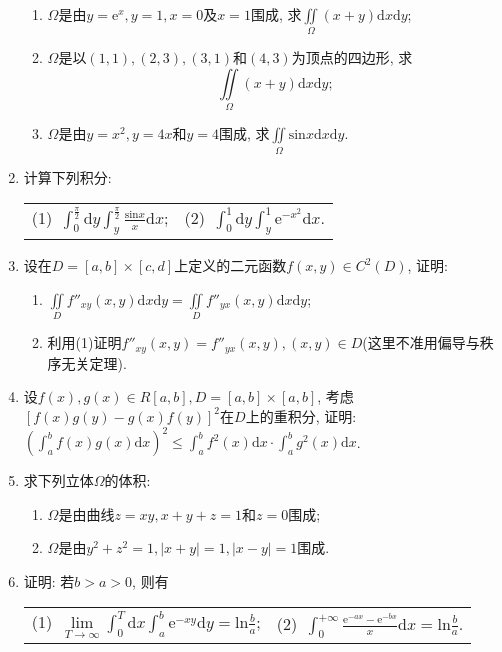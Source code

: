 \begin{enumerate}
\begin{enumerate}
	\item $\Omega$是由$y=\mathrm{e}^x, y=1,x=0$及$x=1$围成, 求$\displaystyle{\underset{\Omega}{\iint}(x+y)\mathrm{d}x\mathrm{d}y}$;
	\item $\Omega$是以$(1,1),(2,3),(3,1)$和$(4,3)$为顶点的四边形, 求$$
	\displaystyle{\underset{\Omega}{\iint}(x+y)\mathrm{d}x\mathrm{d}y};$$
	\item $\Omega$是由$y=x^2,y=4x$和$y=4$围成, 求$\displaystyle{\underset{\Omega}{\iint}\mathrm{sin}x\mathrm{d}x\mathrm{d}y}$.
\end{enumerate}
\item 计算下列积分:
\begin{table}[H]
	\begin{tabular}{ll}
		\qquad	(1)\ $\displaystyle{\int_{0}^{\frac{\pi}{2}}\mathrm{d}y\int_{y}^{\frac{\pi}{2}}\frac{\mathrm{sin}x}{x}\mathrm{d}x}$;\qquad \qquad \qquad \qquad &(2)\ $\displaystyle{\int_{0}^{1}\mathrm{d}y\int_{y}^{1}\mathrm{e}^{-x^2}\mathrm{d}x}$.
	\end{tabular}
\end{table}
\item 设在$D=[a,b]\times[c,d]$上定义的二元函数$f(x,y)\in C^2(D)$, 证明:
\begin{enumerate}
		\item $\displaystyle{\underset{D}{\iint}f''_{xy}(x,y)\mathrm{d}x\mathrm{d}y}=\displaystyle{\underset{D}{\iint}f''_{yx}(x,y)\mathrm{d}x\mathrm{d}y}$;
		\item 利用(1)证明$f''_{xy}(x,y)=f''_{yx}(x,y),(x,y)\in D$(这里不准用偏导与秩序无关定理).
\end{enumerate}
\item 设$f(x),g(x)\in R[a,b], D=[a,b]\times[a,b]$, 考虑$[f(x)g(y)-g(x)f(y)]^2$在$D$上的重积分, 证明:
$\left(\displaystyle{\int_{a}^{b}f(x)g(x)\mathrm{d}x} \right)^2\le \displaystyle{\int_{a}^{b}f^2(x)\mathrm{d}x\cdot \int_{a}^{b}g^2(x)\mathrm{d}x}$.
\item 求下列立体$\Omega$的体积:
\begin{enumerate}
	\item $\Omega$是由曲线$z=xy,x+y+z=1$和$z=0$围成;
	\item $\Omega$是由$y^2+z^2=1,|x+y|=1,|x-y|=1$围成.
\end{enumerate}
\item 证明: 若$b>a>0$, 则有
\begin{table}[H]
	\begin{tabular}{ll}
	\qquad	(1)\ $\lim\limits_{T\rightarrow \infty}\displaystyle{\int_{0}^{T}\mathrm{d}x\int_{a}^{b}\mathrm{e}^{-xy}\mathrm{d}y=\mathrm{ln}\frac{b}{a}}$;\qquad \qquad \qquad \qquad & (2)\ $\displaystyle{\int_{0}^{+\infty}\frac{\mathrm{e}^{-ax}-\mathrm{e}^{-bx}}{x}\mathrm{d}x=\mathrm{ln}\frac{b}{a}}$.

\end{tabular}
\end{table}
\end{enumerate}

